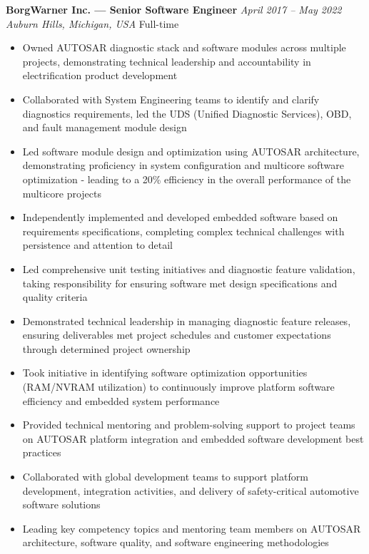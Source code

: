 \documentclass[11pt,letterpaper]{article}
\newcommand{\RoleHeading}[4]{%
  {\bfseries#1} \hfill {\itshape#2}\\
  {\itshape#3} \hfill #4
}
\newenvironment{jobenvironment}[4]{%
  \needspace{2cm}
  \vspace{0.15cm}
  \RoleHeading{#1}{#2}{#3}{#4}
  \vspace{0.05cm}
  \begin{itemize}[leftmargin=0.2in, itemsep=0.05cm, parsep=0cm]
}{%
  \end{itemize}
}
\begin{document}
\begin{jobenvironment}
  {BorgWarner Inc. — Senior Software Engineer}
  {April 2017 -- May 2022}
  {Auburn Hills, Michigan, USA}
  {Full-time}

  \item Owned AUTOSAR diagnostic stack and software modules across multiple projects, demonstrating technical leadership and accountability in electrification product development
  \item Collaborated with System Engineering teams to identify and clarify diagnostics requirements, led the UDS (Unified Diagnostic Services), OBD, and fault management module design
  \item Led software module design and optimization using AUTOSAR architecture, demonstrating proficiency in system configuration and multicore software optimization - leading to a 20\% efficiency in the overall performance of the multicore projects
  \item Independently implemented and developed embedded software based on requirements specifications, completing complex technical challenges with persistence and attention to detail
  \item Led comprehensive unit testing initiatives and diagnostic feature validation, taking responsibility for ensuring software met design specifications and quality criteria
  \item Demonstrated technical leadership in managing diagnostic feature releases, ensuring deliverables met project schedules and customer expectations through determined project ownership
  \item Took initiative in identifying software optimization opportunities (RAM/NVRAM utilization) to continuously improve platform software efficiency and embedded system performance
  \item Provided technical mentoring and problem-solving support to project teams on AUTOSAR platform integration and embedded software development best practices
  \item Collaborated with global development teams to support platform development, integration activities, and delivery of safety-critical automotive software solutions
  \item Leading key competency topics and mentoring team members on AUTOSAR architecture, software quality, and software engineering methodologies
\end{jobenvironment}
\end{document}

